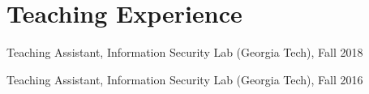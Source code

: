 \section*{Teaching Experience}
\begin{description}

\item Teaching Assistant, Information Security Lab (Georgia Tech), Fall 2018 
\item Teaching Assistant, Information Security Lab (Georgia Tech), Fall 2016

\end{description}
